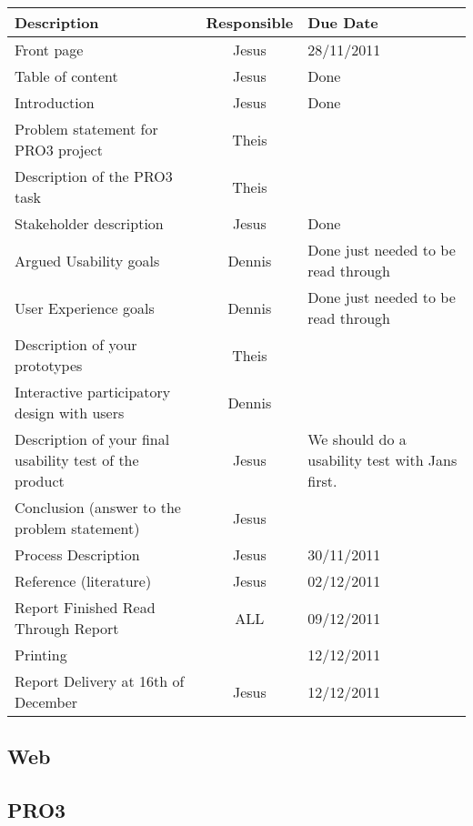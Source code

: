 \documentclass[10pt,a4paper]{article}
\begin{document}
\begin{tabular}{ | p{8cm} | c | p{5cm} |}
\hline
Description & Responsible & Due Date \\ \hline
Front page & Jesus & 28/11/2011\\ \hline
Table of content & Jesus & Done \\ \hline
Introduction & Jesus & Done\\ \hline
Problem statement for PRO3 project & Theis & \\ \hline
Description of the PRO3 task & Theis & \\ \hline
Stakeholder description & Jesus  & Done\\ \hline
Argued Usability goals & Dennis & Done just needed to be read through\\ \hline
User Experience goals &  Dennis  & Done just needed to be read through\\ \hline
Description of your prototypes & Theis & \\ \hline
Interactive participatory design with users & Dennis  & \\ \hline
Description of your final usability test of the product & Jesus & We should do a usability test with Jans first. \\ \hline
Conclusion (answer to the problem statement) & Jesus  & \\ \hline
Process Description & Jesus & 30/11/2011\\ \hline
Reference (literature) & Jesus  &  02/12/2011\\ \hline
Report Finished Read Through Report & ALL & 09/12/2011\\ \hline
Printing &  & 12/12/2011\\ \hline
Report Delivery at 16th of December & Jesus & 12/12/2011 \\ \hline
\hline
\end{tabular}

\subsection{Web}

\subsection{PRO3}
\end{document}
